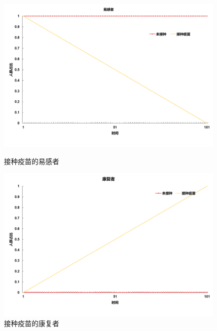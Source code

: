 \begin{figure}[htbp]
	\begin{minipage}{0.49\linewidth}
		\centering
		\includegraphics[width=0.9\linewidth]{fig/image045.png}
		\caption{接种疫苗的易感者}
		\label{fig:ima25}%
	\end{minipage}
	\begin{minipage}{0.49\linewidth}
		\centering
		\includegraphics[width=0.9\linewidth]{fig/image047.png}
		\caption{接种疫苗的康复者}
		\label{fig:ima26}%
	\end{minipage}


\end{figure}

